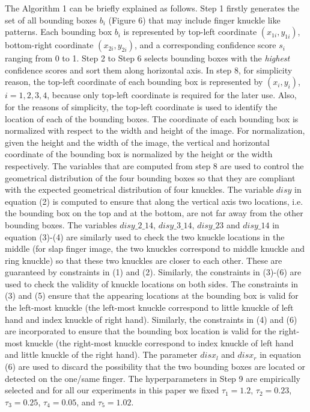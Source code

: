 The Algorithm 1 can be briefly explained as follows. Step 1 firstly generates the set of all bounding boxes $b_i$ (Figure 6) that may include finger knuckle like patterns. Each bounding box $b_i$ is represented by top-left coordinate $(x_{1i},y_{1i})$, bottom-right coordinate $(x_{2i},y_{2i})$, and a corresponding confidence score $s_i$ ranging from 0 to 1. Step 2 to Step 6 selects bounding boxes with the \textit{highest} confidence scores and sort them along horizontal axis. In step 8, for simplicity reason, the top-left coordinate of each bounding box is represented by $(x_i,y_i)$, $i=1,2,3,4$, because only top-left coordinate is required for the later use. Also, for the reasons of simplicity, the top-left coordinate is used to identify the location of each of the bounding boxes. The coordinate of each bounding box is normalized with respect to the width and height of the image. For normalization, given the height and the width of the image, the vertical and horizontal coordinate of the bounding box is normalized by the height or the width respectively. The variables that are computed from step 8 are used to control the geometrical distribution of the four bounding boxes so that they are compliant with the expected geometrical distribution of four knuckles. The variable $disy$ in equation (2) is computed to ensure that along the vertical axis two locations, i.e. the bounding box on the top and at the bottom, are not far away from the other bounding boxes. The variables $disy\_2\_14$, $disy\_3\_14$, $disy\_23$ and $disy\_14$ in equation (3)-(4) are similarly used to check the two knuckle locations in the middle (for slap finger image, the two knuckles correspond to middle knuckle and ring knuckle) so that these two knuckles are closer to each other. These are guaranteed by constraints in (1) and (2). Similarly, the constraints in (3)-(6) are used to check the validity of knuckle locations on both sides. The constraints in (3) and (5) ensure that the appearing locations at the bounding box is valid for the left-most knuckle (the left-most knuckle correspond to little knuckle of left hand and index knuckle of right hand). Similarly, the constraints in (4) and (6) are incorporated to ensure that the bounding box location is valid for the right-most knuckle (the right-most knuckle correspond to index knuckle of left hand and little knuckle of the right hand). The parameter $disx_l$ and $disx_r$ in equation (6) are used to discard the possibility that the two bounding boxes are located or detected on the one/same finger. The hyperparameters in Step 9 are empirically selected and for all our experiments in this paper we fixed $\tau_1=1.2$, $\tau_2=0.23$, $\tau_3=0.25$, $\tau_4=0.05$, and $\tau_5=1.02$.

